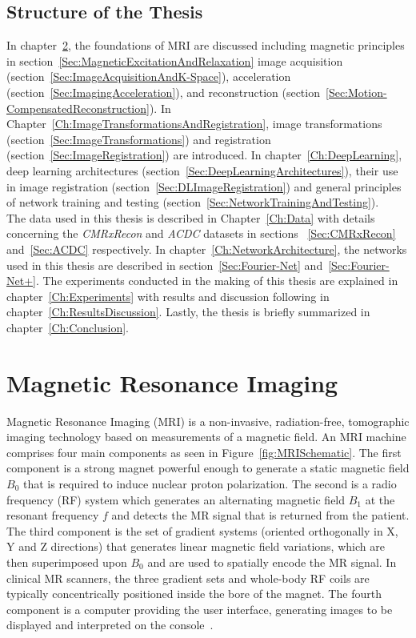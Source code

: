 \documentclass[english,version-2022-01]{uzl-thesis} %
\begin{document}
\section{Structure of the Thesis} \label{Sec:Structure}
In chapter~\ref{Ch:MRI}, the foundations of MRI are discussed including magnetic principles in section~\ref{Sec:MagneticExcitationAndRelaxation} image acquisition (section~\ref{Sec:ImageAcquisitionAndK-Space}), acceleration (section~\ref{Sec:ImagingAcceleration}), and reconstruction (section~\ref{Sec:Motion-CompensatedReconstruction}). In Chapter~\ref{Ch:ImageTransformationsAndRegistration}, image transformations (section~\ref{Sec:ImageTransformations}) and registration (section~\ref{Sec:ImageRegistration}) are introduced. In chapter~\ref{Ch:DeepLearning}, deep learning architectures (section~\ref{Sec:DeepLearningArchitectures}), their use in image registration (section~\ref{Sec:DLImageRegistration}) and general principles of network training and testing (section~\ref{Sec:NetworkTrainingAndTesting}).\\
The data used in this thesis is described in Chapter~\ref{Ch:Data} with details concerning the 
\emph{CMRxRecon} and \emph{ACDC} datasets in sections
~\ref{Sec:CMRxRecon} and~\ref{Sec:ACDC} respectively.%
In chapter~\ref{Ch:NetworkArchitecture}, the networks used in this thesis
are described in section~\ref{Sec:Fourier-Net} and~\ref{Sec:Fourier-Net+}.%
The experiments conducted in the making of this thesis are explained in chapter~\ref{Ch:Experiments} with results and discussion following in chapter~\ref{Ch:ResultsDiscussion}.%
Lastly, the thesis is briefly summarized in chapter~\ref{Ch:Conclusion}.



\chapter{Magnetic Resonance Imaging} \label{Ch:MRI}
Magnetic Resonance Imaging (MRI) is a non-invasive, radiation-free, tomographic imaging technology based on measurements of a magnetic field.  An MRI machine comprises four main components as seen in Figure~\ref{fig:MRISchematic}. The first component is a strong magnet powerful enough to generate a static magnetic field $B_0$ that is required to induce nuclear proton polarization. The second is a radio frequency (RF) system which generates an alternating magnetic field $B_1$ at the resonant frequency $f$ and detects the MR signal that is returned from the patient. The third component is the set of gradient systems (oriented orthogonally in X, Y and Z directions) that generates linear magnetic field variations, which are then superimposed upon $B_0$ and are used to spatially encode the MR signal. In clinical MR scanners, the three gradient sets and whole-body RF coils are typically concentrically positioned inside the bore of the magnet. The fourth component is a computer providing the user interface, generating images to be displayed and interpreted on the console~\cite{Serai2021}.
\end{document}
